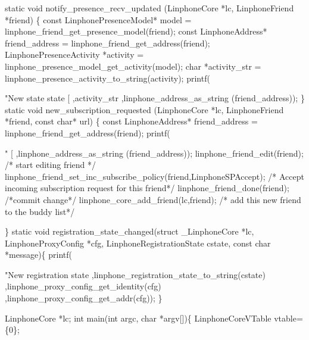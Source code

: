 \begin{DoxyCodeInclude}
\textcolor{keyword}{static} \textcolor{keywordtype}{void} notify\_presence\_recv\_updated (LinphoneCore *lc,  LinphoneFriend *\textcolor{keyword}{friend}) \{
        \textcolor{keyword}{const} LinphonePresenceModel* model = linphone_friend_get_presence_model(\textcolor{keyword}{friend});
        \textcolor{keyword}{const} LinphoneAddress* friend\_address = linphone_friend_get_address(\textcolor{keyword}{friend});
        LinphonePresenceActivity *activity = 
      linphone_presence_model_get_activity(model);
        \textcolor{keywordtype}{char} *activity\_str = linphone_presence_activity_to_string(activity);
        printf(\textcolor{stringliteral}{"New state state [%
                                ,activity\_str
                                ,linphone_address_as_string (friend\_address));
\}
\textcolor{keyword}{static} \textcolor{keywordtype}{void} new\_subscription\_requested (LinphoneCore *lc,  LinphoneFriend *\textcolor{keyword}{friend}, \textcolor{keyword}{const} \textcolor{keywordtype}{char}* url) \{
        \textcolor{keyword}{const} LinphoneAddress* friend\_address = linphone_friend_get_address(\textcolor{keyword}{friend});
        printf(\textcolor{stringliteral}{" [%
                                ,linphone_address_as_string (friend\_address));
        linphone_friend_edit(\textcolor{keyword}{friend}); \textcolor{comment}{/* start editing friend */}
        linphone_friend_set_inc_subscribe_policy(\textcolor{keyword}{friend},LinphoneSPAccept); \textcolor{comment}{/* Accept incoming subscription
       request for this friend*/}
        linphone_friend_done(\textcolor{keyword}{friend}); \textcolor{comment}{/*commit change*/}
        linphone_core_add_friend(lc,\textcolor{keyword}{friend}); \textcolor{comment}{/* add this new friend to the buddy list*/}

\}
\textcolor{keyword}{static} \textcolor{keywordtype}{void} registration\_state\_changed(\textcolor{keyword}{struct} \_LinphoneCore *lc, 
      LinphoneProxyConfig *cfg, LinphoneRegistrationState cstate, \textcolor{keyword}{const} \textcolor{keywordtype}{char} *message)\{
                printf(\textcolor{stringliteral}{"New registration state %
                                ,linphone_registration_state_to_string(cstate)
                                ,linphone_proxy_config_get_identity(cfg)
                                ,linphone_proxy_config_get_addr(cfg));
\}

LinphoneCore *lc;
\textcolor{keywordtype}{int} main(\textcolor{keywordtype}{int} argc, \textcolor{keywordtype}{char} *argv[])\{
        LinphoneCoreVTable vtable=\{0\};

}}}
\end{DoxyCodeInclude}
